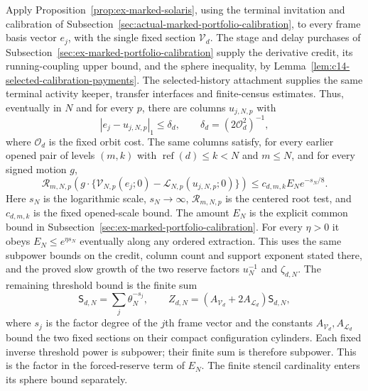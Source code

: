 Apply Proposition~\ref{prop:ex-marked-solaris}, using the terminal
invitation and calibration of
Subsection~\ref{sec:actual-marked-portfolio-calibration}, to every frame
basis vector $e_j$, with the single fixed section $\mathcal V_d$.
The stage and delay purchases of
Subsection~\ref{sec:ex-marked-portfolio-calibration} supply the derivative
credit, its running-coupling upper bound, and the sphere inequality,
by Lemma~\ref{lem:c14-selected-calibration-payments}.
The selected-history attachment supplies the same terminal activity
keeper, transfer interfaces and finite-census estimates. Thus, eventually
in $N$ and for every $p$, there are columns $u_{j,N,p}$ with
\[
 |e_j-u_{j,N,p}|_1\le\delta_d,
                      \qquad \delta_d=(2\mathcal O_d^2)^{-1},
\]
where $\mathcal O_d$ is the fixed orbit cost. The same columns satisfy,
for every earlier opened pair of levels $(m,k)$ with
$\operatorname{ref}(d)\le k<N$ and $m\le N$, and for every signed
motion $g$,
\begin{equation}\label{eq:equation-column-root}
 \mathcal R_{m,N,p}\!\left(
  g\cdot\{\mathcal V_{N,p}(e_j;0)
                 -\mathcal L_{N,p}(u_{j,N,p};0)\}\right)
       \le c_{d,m,k}E_N e^{-s_N/8}.
\end{equation}
Here $s_N$ is the logarithmic scale, $s_N\to\infty$,
$\mathcal R_{m,N,p}$ is the centered root test, and $c_{d,m,k}$ is
the fixed opened-scale bound. The amount $E_N$ is the explicit common
bound in Subsection~\ref{sec:ex-marked-portfolio-calibration}. For every
$\eta>0$ it obeys $E_N\le e^{\eta s_N}$ eventually along any ordered
extraction. This uses the same subpower bounds on the credit, column
count and support exponent stated there, and the proved slow growth of
the two reserve factors $u_N^{-1}$ and $\zeta_{d,N}$. The
remaining threshold bound is the finite sum
\[
 \mathsf S_{d,N}=\sum_j\theta_N^{-s_j},
 \qquad Z_{d,N}=(A_{\mathcal V_d}+2A_{\mathcal L_d})\mathsf S_{d,N},
\]
where $s_j$ is the factor degree of the $j$th frame vector and the
constants $A_{\mathcal V_d},A_{\mathcal L_d}$ bound the two fixed
sections on their compact configuration cylinders. Each fixed inverse
threshold power is subpower; their finite sum is therefore subpower.
This is the factor in the forced-reserve term of $E_N$. The finite
stencil cardinality enters its sphere bound separately.

